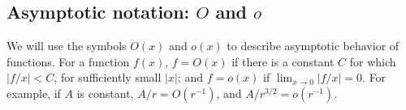 \documentclass[12pt]{article}
\begin{document}
\subsection*{Asymptotic notation: $O$ and $o$}
We will use the symbols $O(x)$ and $o(x)$ to describe asymptotic behavior 
of functions. For a function $f(x)$, $f=O(x)$ if there is a 
constant $C$ for which $ |f/x|<C$, for sufficiently small $|x|$; 
and $f=o(x)$ if $\lim_{x\rightarrow 0}|f/x|=0$. 
For example, if $A$ is constant, $A/r = O(r^{-1})$, 
and $A/r^{3/2} = o(r^{-1})$.  




\end{document}
